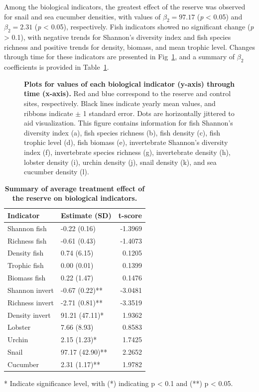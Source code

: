 \documentclass[10pt,letterpaper]{article}
\begin{document}
Among the biological indicators, the greatest effect of the reserve was observed for snail and sea cucumber densities, with values of \(\beta_2 = 97.17\) (\emph{p} \textless{} 0.05) and \(\beta_2 = 2.31\) (\emph{p} \textless{} 0.05), respectively. Fish indicators showed no significant change (\emph{p} \textgreater{} 0.1), with negative trends for Shannon's diversity index and fish species richness and positive trends for density, biomass, and mean trophic level. Changes through time for these indicators are presented in Fig~\ref{fig5}, and a summary of \(\beta_2\) coefficients is provided in Table~\ref{table3}.

\begin{figure}[!h]
\caption{{\bf Plots for values of each biological indicator (y-axis) through time (x-axis).}
Red and blue correspond to the reserve and control sites, respectively. Black lines indicate yearly mean values, and ribbons indicate \(\pm\) 1 standard error. Dots are horizontally jittered to aid visualization. This figure contains information for fish Shannon's diversity index (a), fish species richness (b), fish density (c), fish trophic level (d), fish biomass (e), invertebrate Shannon's diversity index (f), invertebrate species richness (g), invertebrate density (h), lobster density (i), urchin density (j), snail density (k), and sea cucumber density (l).}
\label{fig5}
\end{figure}

\begin{table}[!ht]
\centering
\caption{
{\bf Summary of average treatment effect of the reserve on biological indicators.}}
\begin{tabular}{l|l|r}
\hline
\bfseries{Indicator} & \bfseries{Estimate (SD)} & \bfseries{t-score}\\
\hline
Shannon fish & -0.22 (0.16) & -1.3969\\
\hline
Richness fish & -0.61 (0.43) & -1.4073\\
\hline
Density fish & 0.74 (6.15) & 0.1205\\
\hline
Trophic fish & 0.00 (0.01) & 0.1399\\
\hline
Biomass fish & 0.22 (1.47) & 0.1476\\
\hline
Shannon invert & -0.67 (0.22)** & -3.0481\\
\hline
Richness invert & -2.71 (0.81)** & -3.3519\\
\hline
Density invert & 91.21 (47.11)* & 1.9362\\
\hline
Lobster & 7.66 (8.93) & 0.8583\\
\hline
Urchin & 2.15 (1.23)* & 1.7425\\
\hline
Snail & 97.17 (42.90)** & 2.2652\\
\hline
Cucumber & 2.31 (1.17)** & 1.9782\\
\hline
\end{tabular}
\begin{flushleft} * Indicate significance level, with (*) indicating p \textless{} 0.1 and (**) p \textless{} 0.05.
\end{flushleft}
\label{table3}
\end{table}
\end{document}
